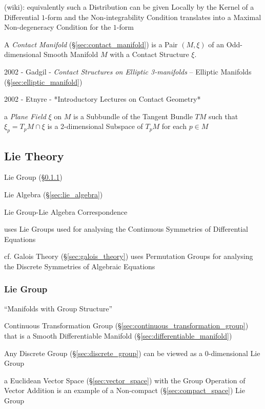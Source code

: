 \begin{itemize}
(wiki): equivalently such a Distribution can be given Locally by the Kernel of
a Differential $1$-form and the Non-integrability Condition translates into a
Maximal Non-degeneracy Condition for the $1$-form

A \emph{Contact Manifold} (\S\ref{sec:contact_manifold}) is a Pair $(M,\xi)$ of
an Odd-dimensional Smooth Manifold $M$ with a Contact Structure $\xi$.

2002 - Gadgil - \emph{Contact Structures on Elliptic 3-manifolds}
-- Elliptic Manifolds (\S\ref{sec:elliptic_manifold})

2002 - Etnyre - *Introductory Lectures on Contact Geometry*

a \emph{Plane Field} $\xi$ on $M$ is a Subbundle of the Tangent Bundle $TM$
such that $\xi_p = T_p M \cap \xi$ is a 2-dimensional Subspace of $T_pM$ for
each $p \in M$



\subsection{Lie Theory}\label{sec:lie_theory}

Lie Group (\S\ref{sec:lie_group})

Lie Algebra (\S\ref{sec:lie_algebra})

Lie Group-Lie Algebra Correspondence

uses Lie Groups used for analysing the Continuous Symmetries of
Differential Equations %

cf. Galois Theory (\S\ref{sec:galois_theory}) uses Permutation Groups
for analysing the Discrete Symmetries of Algebraic Equations %



\subsubsection{Lie Group}\label{sec:lie_group}\hfill

``Manifolds with Group Structure''

Continuous Transformation Group
(\S\ref{sec:continuous_transformation_group}) that is a Smooth
Differentiable Manifold (\S\ref{sec:differentiable_manifold})

Any Discrete Group (\S\ref{sec:discrete_group}) can be viewed as a
$0$-dimensional Lie Group %

a Euclidean Vector Space (\S\ref{sec:vector_space}) with the Group Operation of
Vector Addition is an example of a Non-compact (\S\ref{sec:compact_space}) Lie
Group


\end{itemize}
